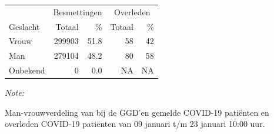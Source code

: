 \documentclass[
  english,
  man,floatsintext]{apa6}
\begin{document}
\begin{table}
\centering\begingroup\fontsize{11}{13}\selectfont

\begin{threeparttable}
\begin{tabular}{lrrrr}
\toprule
\multicolumn{1}{c}{ } & \multicolumn{2}{c}{Besmettingen} & \multicolumn{2}{c}{Overleden} \\
\cmidrule(l{3pt}r{3pt}){2-3} \cmidrule(l{3pt}r{3pt}){4-5}
Geslacht & Totaal & \% & Totaal & \%\\
\midrule
Vrouw & 299903 & 51.8 & 58 & 42\\
Man & 279104 & 48.2 & 80 & 58\\
Onbekend & 0 & 0.0 & NA & NA\\
\bottomrule
\end{tabular}
\begin{tablenotes}
\item \textit{Note: } 
\item Man-vrouwverdeling van bij de GGD’en gemelde COVID-19 patiënten en overleden COVID-19 patiënten van 09 januari t/m 23 januari 10:00 uur.
\end{tablenotes}
\end{threeparttable}
\endgroup{}
\end{table}
\newpage
\end{document}
